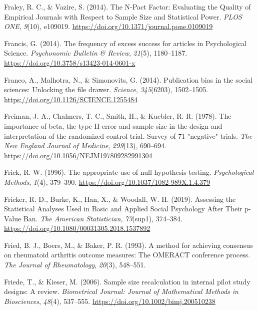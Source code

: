 \documentclass[
  oneside]{krantz}
\newlength{\cslhangindent}
\newlength{\cslentryspacingunit} %
\newenvironment{CSLReferences}[2] %
 {%
  \setlength{\parindent}{0pt}
  \ifodd #1
  \let\oldpar\par
  \def\par{\hangindent=\cslhangindent\oldpar}
  \fi
  \setlength{\parskip}{#2\cslentryspacingunit}
 }%
 {}
\begin{document}
\begin{CSLReferences}{1}{0}
\leavevmode{}%
Fraley, R. C., \& Vazire, S. (2014). The {N-Pact Factor}: {Evaluating}
the {Quality} of {Empirical Journals} with {Respect} to {Sample Size}
and {Statistical Power}. \emph{PLOS ONE}, \emph{9}(10), e109019.
\url{https://doi.org/10.1371/journal.pone.0109019}

\leavevmode{}%
Francis, G. (2014). The frequency of excess success for articles in
{Psychological Science}. \emph{Psychonomic Bulletin \& Review},
\emph{21}(5), 1180--1187.
\url{https://doi.org/10.3758/s13423-014-0601-x}

\leavevmode{}%
Franco, A., Malhotra, N., \& Simonovits, G. (2014). Publication bias in
the social sciences: {Unlocking} the file drawer. \emph{Science},
\emph{345}(6203), 1502--1505.
\url{https://doi.org/10.1126/SCIENCE.1255484}

\leavevmode{}%
Freiman, J. A., Chalmers, T. C., Smith, H., \& Kuebler, R. R. (1978).
The importance of beta, the type {II} error and sample size in the
design and interpretation of the randomized control trial. {Survey} of
71 "negative" trials. \emph{The New England Journal of Medicine},
\emph{299}(13), 690--694.
\url{https://doi.org/10.1056/NEJM197809282991304}

\leavevmode{}%
Frick, R. W. (1996). The appropriate use of null hypothesis testing.
\emph{Psychological Methods}, \emph{1}(4), 379--390.
\url{https://doi.org/10.1037/1082-989X.1.4.379}

\leavevmode{}%
Fricker, R. D., Burke, K., Han, X., \& Woodall, W. H. (2019). Assessing
the {Statistical Analyses Used} in {Basic} and {Applied Social
Psychology After Their} p-{Value Ban}. \emph{The American Statistician},
\emph{73}(sup1), 374--384.
\url{https://doi.org/10.1080/00031305.2018.1537892}

\leavevmode{}%
Fried, B. J., Boers, M., \& Baker, P. R. (1993). A method for achieving
consensus on rheumatoid arthritis outcome measures: The {OMERACT}
conference process. \emph{The Journal of Rheumatology}, \emph{20}(3),
548--551.

\leavevmode{}%
Friede, T., \& Kieser, M. (2006). Sample size recalculation in internal
pilot study designs: A review. \emph{Biometrical Journal: Journal of
Mathematical Methods in Biosciences}, \emph{48}(4), 537--555.
\url{https://doi.org/10.1002/bimj.200510238}


\end{CSLReferences}
\end{document}

